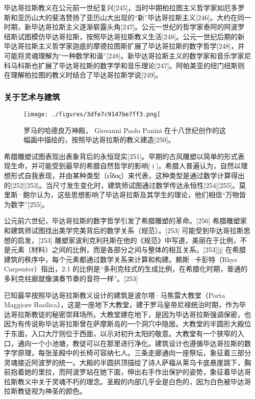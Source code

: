 毕达哥拉斯教义在公元前一世纪复兴[245]，当时中期柏拉图主义哲学家如厄多罗斯和亚历山大的斐洛赞扬了亚历山大出现的“新”毕达哥拉斯主义[246]。大约在同一时期，新毕达哥拉斯主义逐渐崭露头角[247]。公元一世纪的哲学家泰阿的阿波罗纽斯试图模仿毕达哥拉斯，按照毕达哥拉斯教义生活[248]。公元一世纪后期的新毕达哥拉斯主义哲学家迦底的摩德拉图斯扩展了毕达哥拉斯的数字哲学[248]，并可能将灵魂理解为“一种数学和谐”[248]。新毕达哥拉斯主义的数学家和音乐学家尼科马科斯也扩展了毕达哥拉斯的数字学和音乐理论[247]。阿帕美亚的纽门纽斯则在理解柏拉图的教义时结合了毕达哥拉斯学说[249]。
\subsubsection{关于艺术与建筑}
\begin{figure}[ht]
\centering
\texttt{[image: ./figures/3dfe7c9147be7ff3.png]}
\caption{罗马的哈德良万神殿， Giovanni Paolo Panini 在十八世纪创作的这幅画中描绘的，按照毕达哥拉斯的教义建造[250]。} \label{fig_Pythag_15}
\end{figure}
希腊雕塑试图表现出表象背后的永恒现实[251]。早期的古风雕塑以简单的形式表现生命，并可能受到最早的希腊自然哲学的影响[ i ]。希腊人普遍认为，自然以理想形式自我表现，并由某种类型（εἶδος）来代表，这种类型是通过数学计算得出的[252][253]。当尺寸发生变化时，建筑师试图通过数学传达永恒性[254][255]。莫里斯·鲍尔认为，这些思想影响了毕达哥拉斯及其学生的理论，他们相信“万物皆为数字”[255]。

公元前六世纪，毕达哥拉斯的数字哲学引发了希腊雕塑的革命。[256] 希腊雕塑家和建筑师试图找出美学完美背后的数学关系（规范）。[253] 可能受到毕达哥拉斯思想的启发，[253] 雕塑家波利克利托斯在他的《规范》中写道，美丽在于比例，不是元素（材料）之间的比例，而是各部分之间与整体的相互关系。[253][j] 在希腊建筑的秩序中，每个元素都通过数学关系来计算和构建。赖斯·卡彭特（Rhys Carpenter）指出，2:1 的比例是“多利克柱式的生成比例，在希腊化时期，普通的多利克柱廊就像演奏节奏的音符一样”。[253]

已知最早按照毕达哥拉斯教义设计的建筑是波尔塔·马焦雷大教堂（Porta Maggiore Basilica），这是一座地下大教堂，建于罗马皇帝尼禄统治时期，作为毕达哥拉斯教徒的秘密崇拜场所。大教堂建在地下，是因为毕达哥拉斯强调保密，也因为有传说称毕达哥拉斯曾在萨摩斯岛的一个洞穴中隐居。大教堂的半圆形大殿位于东面，入口大厅则位于西面，以示对初升太阳的敬意。大教堂有一个狭窄的入口，通向一个小池塘，教徒可以在那里进行净化。建筑设计也遵循毕达哥拉斯的数字学原理，每张圣殿中的长椅可容纳七人。三条走廊通向一座祭坛，象征着三部分灵魂接近阿波罗的统一。大殿的半圆拱顶描绘了诗人萨福从莱乌卡底悬崖跳下，胸前抱着她的里拉，而阿波罗站在她下面，伸出右手作出保护的姿势，象征着毕达哥拉斯教义中关于灵魂不朽的理念。圣殿的内部几乎全是白色的，因为白色被毕达哥拉斯教徒视为神圣的颜色。

